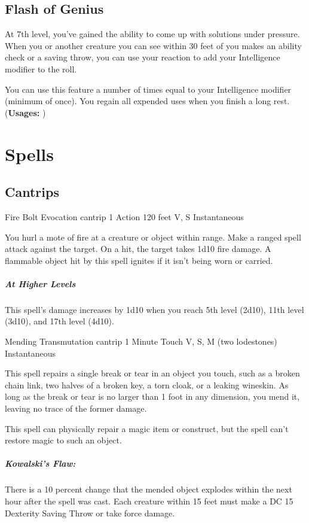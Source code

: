 {\subsection*{Flash of Genius}
At 7th level, you've gained the ability to come up with solutions under pressure. When you or another creature you can see within 30 feet of you makes an ability check or a saving throw, you can use your reaction to add your Intelligence modifier to the roll.

You can use this feature a number of times equal to your Intelligence modifier (minimum of once). You regain all expended uses when you finish a long rest.\\
(\textbf{Usages: })

\section*{Spells}
\subsection*{Cantrips}

\DndSpellHeader
	{Fire Bolt}
	{Evocation cantrip}
	{1 Action}
	{120 feet}
	{V, S}
	{Instantaneous}

You hurl a mote of fire at a creature or object within range. Make a ranged spell attack against the target. On a hit, the target takes 1d10 fire damage. A flammable object hit by this spell ignites if it isn’t being worn or carried.

\subparagraph*{At Higher Levels} This spell’s damage increases by 1d10 when you reach 5th level (2d10), 11th level (3d10), and 17th level (4d10).

\DndSpellHeader
  {Mending}
  {Transmutation cantrip}
  {1 Minute}
  {Touch}
  {V, S, M (two lodestones)}
  {Instantaneous}

This spell repairs a single break or tear in an object you touch, such as a broken chain link, two halves of a broken key, a torn cloak, or a leaking wineskin. As long as the break or tear is no larger than 1 foot in any dimension, you mend it, leaving no trace of the former damage.

This spell can physically repair a magic item or construct, but the spell can’t restore magic to such an object.

\subparagraph*{Kowalski's Flaw:} There is a 10 percent change that the mended object explodes within the next hour after the spell was cast. Each creature within 15 feet must make a DC 15 Dexterity Saving Throw or take  force damage.

}
